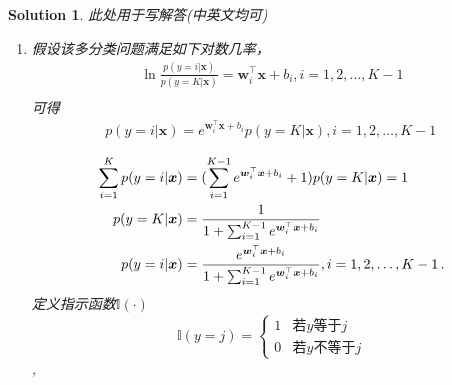 \documentclass[a4paper,UTF8]{article}
\numberwithin{equation}{section}
\newtheorem*{solution}{Solution}
\begin{document}
	\begin{solution}
		此处用于写解答(中英文均可)\\
		
		\begin{enumerate}[(1)]
			\item 假设该多分类问题满足如下对数几率，
			\begin{equation*}
			\begin{split}
			\ln \frac{p(y=i|\bm{x})}{p(y=K|\bm{x})} = \bm{w}^{\top}_{i}\bm{x}+b_{i} , i=1,2,\ldots,K-1
\\
			\end{split}
			\end{equation*}
			可得
			\begin{equation*}
			\begin{split}
			p(y=i|\bm{x}) = e^{\bm{w}^{\top}_{i}\bm{x}+b_{i}}p(y=K|\bm{x}) , i=1,2,\ldots,K-1  \,
\\
			\end{split}
			\end{equation*}
			\begin{equation*}
			\centering
			\begin{split}
			\sum_{i=1}^{K} p(y=i|\bm{x}) &= (\sum_{i=1}^{K-1} e^{\bm{w}^{\top}_{i}\bm{x}+b_{i}} + 1)p(y=K|\bm{x})=1 \, \\
			p(y=K|\bm{x}) &= \frac{1}{1+\sum_{i=1}^{K-1} e^{\bm{w}^{\top}_{i}\bm{x}+b_{i}}} \, \\
			p(y=i|\bm{x}) &= \frac{e^{\bm{w}^{\top}_{i}\bm{x}+b_{i}}}{1+\sum_{i=1}^{K-1}e^{\bm{w}^{\top}_{i}\bm{x}+b_{i}}} , i=1,2,\ldots,K-1 \,.\\
			\end{split}
			\end{equation*}
			定义指示函数$\mathbb{I}(\cdot)$
			$$\mathbb{I}(y=j)=
			\begin{cases}
			1& \text{若$y$等于$j$}\\
			0& \text{若$y$不等于$j$}
			\end{cases}$$,
			

\end{enumerate}
\end{solution}
\end{document}
